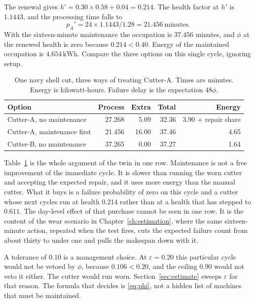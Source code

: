 The renewal gives \(h' = 0.30 \times 0.58 + 0.04 = 0.214\). The health factor at \(h'\) is \(1.1443\), and the processing time falls to
\begin{equation}
p_A' = 24 \times 1.1443 / 1.28 = 21.456 \ \mathrm{minutes} .
\end{equation}
With the sixteen-minute maintenance the occupation is \(37.456\) minutes, and \(\phi\) at the renewed health is zero because \(0.214 < 0.40\). Energy of the maintained occupation is \(4.654\,\mathrm{kWh}\). Compare the three options on this single cycle, ignoring setup.

\begin{table}[ht]
\centering
\caption{One navy shell cut, three ways of treating Cutter-A. Times are minutes. Energy is kilowatt-hours. Failure delay is the expectation \(48\phi\).}
\label{tab:worked}
\begin{tabular}{lrrrr}
\toprule
Option & Process & Extra & Total & Energy \\
\midrule
Cutter-A, no maintenance & 27.268 & 5.09 & 32.36 & 3.90 + repair share \\
Cutter-A, maintenance first & 21.456 & 16.00 & 37.46 & 4.65 \\
Cutter-B, no maintenance & 37.265 & 0.00 & 37.27 & 1.64 \\
\bottomrule
\end{tabular}
\end{table}

Table~\ref{tab:worked} is the whole argument of the twin in one row. Maintenance is not a free improvement of the immediate cycle. It is slower than running the worn cutter and accepting the expected repair, and it uses more energy than the manual cutter. What it buys is a failure probability of zero on this cycle and a cutter whose next cycles run at health \(0.214\) rather than at a health that has stepped to \(0.611\). The day-level effect of that purchase cannot be seen in one row. It is the content of the wear scenario in Chapter~\ref{ch:estimation}, where the same sixteen-minute action, repeated when the test fires, cuts the expected failure count from about thirty to under one and pulls the makespan down with it.

A tolerance of \(0.10\) is a management choice. At \(\varepsilon = 0.20\) this particular cycle would not be vetoed by \(\phi\), because \(0.106 < 0.20\), and the ceiling \(0.90\) would not veto it either. The cutter would run worn. Section~\ref{sec:estimate} sweeps \(\varepsilon\) for that reason. The formula that decides is \eqref{eq:phi}, not a hidden list of machines that must be maintained.

